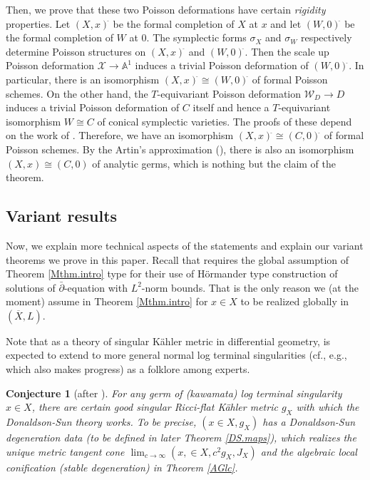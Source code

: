 \documentclass[12pt,a4paper]{amsart}
\newtheorem{conj}[Thm]{Conjecture}
\theoremstyle{remark}
\theoremstyle{definition}
\begin{document}
Then, we prove that these two Poisson deformations have certain 
{\it rigidity} properties. Let $(X, x)^{\hat{}}$ be the formal completion of $X$ at $x$ and let $(W, 0)^{\hat{}}$ be the formal completion of $W$ at $0$. The symplectic forms $\sigma_X$ and $\sigma_W$ respectively determine Poisson structures on $(X, x)^{\hat{}}$ and $(W, 0)^{\hat{}}$. Then the scale up Poisson deformation $\mathcal{X} \to \mathbb{A}^1$ induces a trivial Poisson deformation of $(W, 0)^{\hat{}}$. In particular, there is an isomorphism 
$(X, x)^{\hat{}} \cong (W, 0)^{\hat{}}$ of formal Poisson schemes. On the other hand, the $T$-equivariant Poisson deformation $\mathcal{W}_D \to D$ induces a trivial Poisson deformation of $C$ itself and hence 
a $T$-equivariant isomorphism $W \cong C$ of conical symplectic varieties. 
The proofs of these depend on the work of \cite{Nama, Namb, Namf}. 
Therefore, we have an isomorphism 
$(X, x)^{\hat{}} \cong (C, 0)^{\hat{}}$ of formal Poisson schemes. By the Artin's approximation (\cite{Artin}), there is also an isomorphism 
$(X, x) \cong (C, 0)$ of analytic germs, which is nothing but the claim of the theorem. 

\subsection{Variant results}

Now, we explain more technical aspects of the statements and 
explain our variant theorems we prove in this paper. 
Recall that \cite{DS, DSII} requires the global assumption of 
Theorem \ref{Mthm.intro} type for their use of 
H\"ormander type construction 
of solutions of $\bar{\partial}$-equation 
with $L^2$-norm bounds. 
That is the only reason we (at the moment) assume in Theorem 
\ref{Mthm.intro} for 
$x\in X$ to be realized globally in 
$(\overline{X},L)$. 

Note that \cite{DSII} as a theory of singular 
K\"ahler metric in differential geometry, 
is expected to extend to more general normal log terminal singularities 
(cf., e.g., \cite[\S 3]{Zha24} which also makes progress) 
as a folklore among experts. 

\begin{conj}[after \cite{DSII}]\label{conj:genDS}
For any germ of (kawamata) log terminal 
singularity $x\in X$, 
there are certain good singular Ricci-flat K\"ahler metric 
$g_X$ with which the Donaldson-Sun theory \cite{DSII} works. 
To be precise, $(x\in X,g_X)$  has a Donaldson-Sun degeneration data 
(to be defined in later Theorem \ref{DS.maps}), 
which realizes the unique metric tangent cone 
$\lim_{c\to \infty}(x,\in X,c^2 g_X,J_X)$ 
and the algebraic local conification (stable degeneration) 
in Theorem \ref{AGlc}. 
\end{conj}
\end{document}
